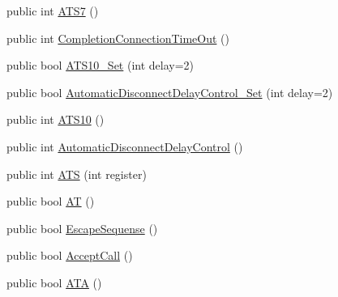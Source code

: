 \begin{DoxyCompactItemize}
\item 
public int \hyperlink{classedwinspire_1_1_ports_1_1_modem_a42b3bc9e47322539d0096a2b788a15b8}{A\-T\-S7} ()
\item 
public int \hyperlink{classedwinspire_1_1_ports_1_1_modem_a17ac02a95f34253204af56a335f91fbb}{Completion\-Connection\-Time\-Out} ()
\item 
public bool \hyperlink{classedwinspire_1_1_ports_1_1_modem_ac204bc4be9ca2efac16047f5f8b0ce97}{A\-T\-S10\-\_\-\-Set} (int delay=2)
\item 
public bool \hyperlink{classedwinspire_1_1_ports_1_1_modem_a5936bc6b960a13a16342ed0ec5c2beca}{Automatic\-Disconnect\-Delay\-Control\-\_\-\-Set} (int delay=2)
\item 
public int \hyperlink{classedwinspire_1_1_ports_1_1_modem_a4a63cb0f3e162a7ec2452ec5c75cb21c}{A\-T\-S10} ()
\item 
public int \hyperlink{classedwinspire_1_1_ports_1_1_modem_a370601da835ffd208161dffce26c9487}{Automatic\-Disconnect\-Delay\-Control} ()
\item 
public int \hyperlink{classedwinspire_1_1_ports_1_1_modem_abff184ed8f81015dd34a6329f36c0e8b}{A\-T\-S} (int register)
\item 
public bool \hyperlink{classedwinspire_1_1_ports_1_1_modem_aaad3610bf3613be174d2b736b71d6d6a}{A\-T} ()
\item 
public bool \hyperlink{classedwinspire_1_1_ports_1_1_modem_afd43d380ad038bcb8c3182d312942720}{Escape\-Sequense} ()
\item 
public bool \hyperlink{classedwinspire_1_1_ports_1_1_modem_a5e1c5afc2ee36df462c761d4a70ca1e4}{Accept\-Call} ()
\item 
public bool \hyperlink{classedwinspire_1_1_ports_1_1_modem_a099275eaffaeaf3eca71f60705317c8e}{A\-T\-A} ()
\end{DoxyCompactItemize}
